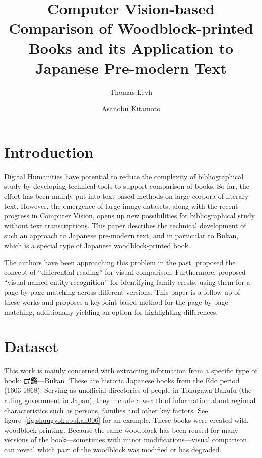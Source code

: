 \documentclass{ltjarticle}
\title{Computer Vision-based Comparison of Woodblock-printed Books and its Application to Japanese Pre-modern Text}
\author[1,3]{Thomas Leyh}
\author[2,3]{Asanobu Kitamoto}
\affil[1]{University of Freiburg}
\affil[2]{ROIS-DS Center for Open Data in the Humanities}
\affil[3]{National Institute of Informatics}
\date{}
\begin{document}
\maketitle

\section{Introduction}

Digital Humanities have potential to reduce the complexity of bibliographical study by developing technical tools to support comparison of books. So far, the effort has been mainly put into text-based methods on large corpora of literary text. However, the emergence of large image datasets, along with the recent progress in Computer Vision, opens up new possibilities for bibliographical study without text transcriptions. This paper describes the technical development of such an approach to Japanese pre-modern text, and in particular to Bukan, which is a special type of Japanese woodblock-printed book.

The authors have been approaching this problem in the past. \cite{kitamoto2018} proposed the concept of “differential reading” for visual comparison. Furthermore, \cite{hakim2019} proposed “visual named-entity recognition” for identifying family crests, using them for a page-by-page matching across different versions. This paper is a follow-up of these works and proposes a keypoint-based method for the page-by-page matching, additionally yielding an option for highlighting differences. 

\section{Dataset}

This work is mainly concerned with extracting information from a specific type of book: 武鑑---Bukan. These are historic Japanese books from the Edo period (1603-1868). Serving as unofficial directories of people in Tokugawa Bakufu (the ruling government in Japan), they include a wealth of information about regional characteristics such as persons, families and other key factors. See figure~\ref{fig:shuugyokubukan006} for an example. These books were created with woodblock-printing. Because the same woodblock has been reused for many versions of the book---sometimes with minor modifications---visual comparison can reveal which part of the woodblock was modified or has degraded.
\end{document}
